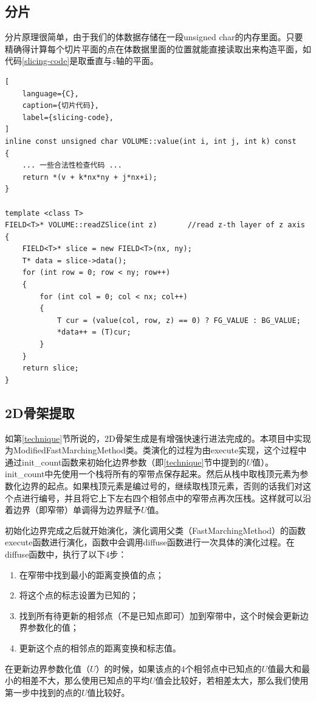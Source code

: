 \subsection{分片}
分片原理很简单，由于我们的体数据存储在一段unsigned char的内存里面。只要精确得计算每个切片平面的点在体数据里面的位置就能直接读取出来构造平面，如代码\ref{slicing-code}是取垂直与$z$轴的平面。
\begin{lstlisting}[
    language={C},
    caption={切片代码},
    label={slicing-code},
]
inline const unsigned char VOLUME::value(int i, int j, int k) const
{
    ... 一些合法性检查代码 ... 
    return *(v + k*nx*ny + j*nx+i);
}

template <class T>
FIELD<T>* VOLUME::readZSlice(int z)       //read z-th layer of z axis
{
    FIELD<T>* slice = new FIELD<T>(nx, ny);
    T* data = slice->data();
    for (int row = 0; row < ny; row++)
    {
        for (int col = 0; col < nx; col++)
        {
            T cur = (value(col, row, z) == 0) ? FG_VALUE : BG_VALUE;
            *data++ = (T)cur;
        }
    }
    return slice;
}
\end{lstlisting}

\subsection{2D骨架提取}
如第\ref{technique}节所说的，2D骨架生成是有增强快速行进法完成的。本项目中实现为ModifiedFastMarchingMethod类。类演化的过程为由execute实现，这个过程中通过init\_count函数来初始化边界参数（即\ref{technique}节中提到的$U$值）。init\_count中先使用一个栈将所有的窄带点保存起来。然后从栈中取栈顶元素为参数化边界的起点。如果栈顶元素是编过号的，继续取栈顶元素，否则的话我们对这个点进行编号，并且将它上下左右四个相邻点中的窄带点再次压栈。这样就可以沿着边界（即窄带）单调得为边界赋予$U$值。

初始化边界完成之后就开始演化，演化调用父类（FastMarchingMethod）的函数execute函数进行演化，函数中会调用diffuse函数进行一次具体的演化过程。在diffuse函数中，执行了以下4步：
\begin{enumerate}
    \item 在窄带中找到最小的距离变换值的点；
    \item 将这个点的标志设置为已知的；
    \item 找到所有待更新的相邻点（不是已知点即可）加到窄带中，这个时候会更新边界参数化的值；
    \item 更新这个点的相邻点的距离变换和标志值。
\end{enumerate}
在更新边界参数化值（$U$）的时候，如果该点的4个相邻点中已知点的$U$值最大和最小的相差不大，那么使用已知点的平均$U$值会比较好，若相差太大，那么我们使用第一步中找到的点的$U$值比较好。

